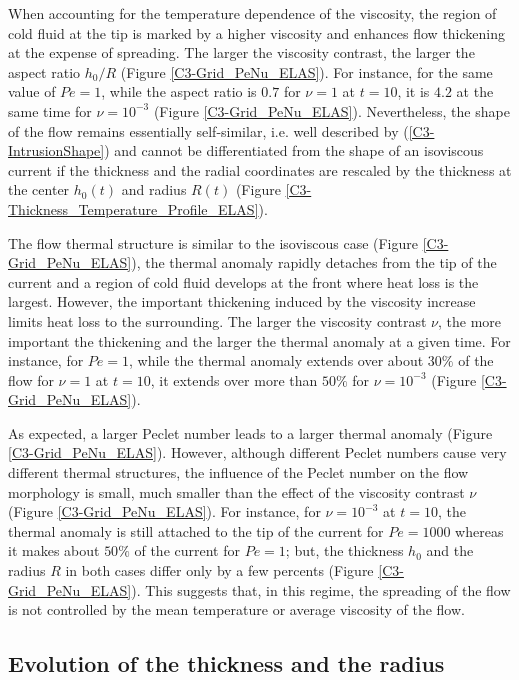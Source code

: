 When accounting for  the temperature dependence of  the viscosity, the
region of cold  fluid at the tip  is marked by a  higher viscosity and
enhances flow thickening at the  expense of spreading.  The larger the
viscosity  contrast,  the  larger  the aspect  ratio  $h_0/R$  (Figure
\ref{C3-Grid_PeNu_ELAS}).  For instance, for the same value of $Pe=1$,
while the aspect ratio is $0.7$ for  $\nu=1$ at $t=10$, it is $4.2$ at
the  same  time  for $\nu=10^{-3}$  (Figure  \ref{C3-Grid_PeNu_ELAS}).
Nevertheless, the shape of  the flow remains essentially self-similar,
i.e.   well  described  by  (\ref{C3-IntrusionShape})  and  cannot  be
differentiated  from  the  shape  of  an  isoviscous  current  if  the
thickness and the radial coordinates  are rescaled by the thickness at
the     center     $h_0(t)$      and     radius     $R(t)$     (Figure
\ref{C3-Thickness_Temperature_Profile_ELAS}).

The flow thermal  structure is similar to the  isoviscous case (Figure
\ref{C3-Grid_PeNu_ELAS}),  the thermal  anomaly rapidly  detaches from
the tip  of the  current and a  region of cold  fluid develops  at the
front  where  heat  loss  is  the  largest.   However,  the  important
thickening induced by  the viscosity increase limits heat  loss to the
surrounding.   The  larger  the  viscosity contrast  $\nu$,  the  more
important the thickening and the larger the thermal anomaly at a given
time.  For  instance, for  $Pe=1$, while  the thermal  anomaly extends
over about $30\%$  of the flow for $\nu=1$ at  $t=10$, it extends over
more than $50\%$ for $\nu=10^{-3}$ (Figure \ref{C3-Grid_PeNu_ELAS}).

As expected, a larger Peclet number  leads to a larger thermal anomaly
(Figure \ref{C3-Grid_PeNu_ELAS}).  However,  although different Peclet
numbers cause very different thermal  structures, the influence of the
Peclet number on  the flow morphology is small, much  smaller than the
effect     of     the     viscosity     contrast     $\nu$     (Figure
\ref{C3-Grid_PeNu_ELAS}).  For instance,  for $\nu=10^{-3}$ at $t=10$,
the thermal  anomaly is still attached  to the tip of  the current for
$Pe = 1000$  whereas it makes about $50\%$ of  the current for $Pe=1$;
but, the thickness $h_0$ and the  radius $R$ in both cases differ only
by  a few  percents (Figure  \ref{C3-Grid_PeNu_ELAS}).  This  suggests
that, in this  regime, the spreading of the flow  is not controlled by
the mean temperature or average viscosity of the flow.
  
\subsection{Evolution of the thickness and the radius}
\label{C3-sec:evol-thickn-radi-e}

